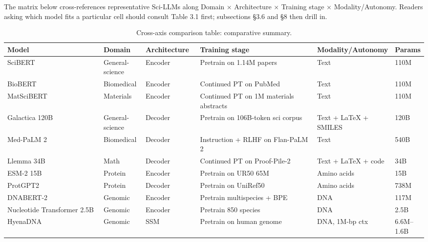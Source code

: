 \documentclass{article}
\begin{document}
The matrix below cross-references representative Sci-LLMs along Domain × Architecture × Training stage × Modality/Autonomy. Readers asking which model fits a particular cell should consult Table 3.1 first; subsections §3.6 and §8 then drill in.

\begin{table}[t]
\centering
\caption{Cross-axis comparison table: comparative summary.}
\label{tab:cross-axis-comparison-table}
\begin{tabular}{>{\raggedright\arraybackslash}p{0.2319\linewidth}
  >{\raggedright\arraybackslash}p{0.1087\linewidth}
  >{\raggedright\arraybackslash}p{0.1377\linewidth}
  >{\raggedright\arraybackslash}p{0.2826\linewidth}
  >{\raggedright\arraybackslash}p{0.1667\linewidth}
  >{\raggedright\arraybackslash}p{0.0725\linewidth}}
\toprule
Model & Domain & Architecture & Training stage & Modality/Autonomy & Params \\
\midrule
SciBERT \cite{beltagy2019arxiv1903106762019} & General-science & Encoder & Pretrain on 1.14M papers & Text & 110M \\
BioBERT \cite{lee2019bioinformatics2019} & Biomedical & Encoder & Continued PT on PubMed & Text & 110M \\
MatSciBERT \cite{gupta2022matscibertamateria} & Materials & Encoder & Continued PT on 1M materials abstracts & Text & 110M \\
Galactica 120B \cite{taylor2022arxiv2211090852022} & General-science & Decoder & Pretrain on 106B-token sci corpus & Text + LaTeX + SMILES & 120B \\
Med-PaLM 2 \cite{singhal2025towardexpertlevelm} & Biomedical & Decoder & Instruction + RLHF on Flan-PaLM 2 & Text & 540B \\
Llemma 34B \cite{azerbayev2023llemmaanopenlangua} & Math & Decoder & Continued PT on Proof-Pile-2 & Text + LaTeX + code & 34B \\
ESM-2 15B \cite{lin2022evolutionaryscalep} & Protein & Encoder & Pretrain on UR50 65M & Amino acids & 15B \\
ProtGPT2 \cite{ferruz2022naturecommunicatio} & Protein & Decoder & Pretrain on UniRef50 & Amino acids & 738M \\
DNABERT-2 \cite{zhou2023arxiv2306150062023} & Genomic & Encoder & Pretrain multispecies + BPE & DNA & 117M \\
Nucleotide Transformer 2.5B \cite{dallatorre2024nucleotidetransfor} & Genomic & Encoder & Pretrain 850 species & DNA & 2.5B \\
HyenaDNA \cite{nguyen2023hyenadnalongrangeg} & Genomic & SSM & Pretrain on human genome & DNA, 1M-bp ctx & 6.6M--1.6B \\

\end{tabular}
\end{table}
\end{document}
